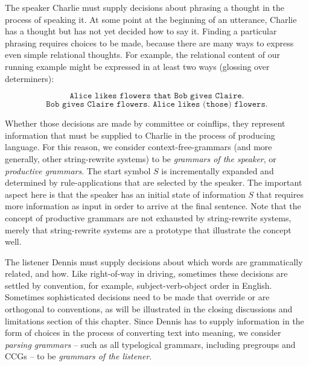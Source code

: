  The speaker Charlie must supply decisions about phrasing a thought in the process of speaking it. At some point at the beginning of an utterance, Charlie has a thought but has not yet decided how to say it. Finding a particular phrasing requires choices to be made, because there are many ways to express even simple relational thoughts. For example, the relational content of our running example might be expressed in at least two ways (glossing over determiners):

\[\texttt{Alice likes flowers that Bob gives Claire.}\]
\[\texttt{Bob gives Claire flowers. Alice likes (those) flowers.}\]

Whether those decisions are made by committee or coinflips, they represent information that must be supplied to Charlie in the process of producing language. For this reason, we consider context-free-grammars (and more generally, other string-rewrite systems) to be \emph{grammars of the speaker}, or \emph{productive grammars}. The start symbol $S$ is incrementally expanded and determined by rule-applications that are selected by the speaker. The important aspect here is that the speaker has an initial state of information $S$ that requires more information as input in order to arrive at the final sentence. Note that the concept of productive grammars are not exhausted by string-rewrite systems, merely that string-rewrite systems are a prototype that illustrate the concept well.

 The listener Dennis must supply decisions about which words are grammatically related, and how. Like right-of-way in driving, sometimes these decisions are settled by convention, for example, subject-verb-object order in English. Sometimes sophisticated decisions need to be made that override or are orthogonal to conventions, as will be illustrated in the closing discussions and limitations section of this chapter. Since Dennis has to supply information in the form of choices in the process of converting text into meaning, we consider \emph{parsing grammars} -- such as all typelogical grammars, including pregroups and CCGs -- to be \emph{grammars of the listener}.


